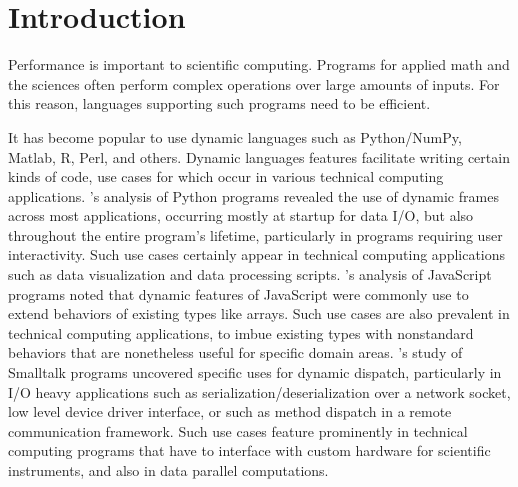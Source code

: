 \section{Introduction}
Performance is important to scientific computing. Programs for applied math and the sciences often perform complex operations over large amounts of inputs. For this reason, languages supporting such programs need to be efficient.

It has become popular to use dynamic languages such as Python/NumPy, Matlab, R, Perl, and others.
Dynamic languages features facilitate writing certain kinds of code, use cases
for which occur in various technical computing applications.
\cite{Holkner2009}'s analysis of Python programs revealed the use of dynamic
frames across most applications, occurring mostly at startup for data I/O, but
also throughout the entire program's lifetime, particularly in programs
requiring user interactivity. Such use cases certainly appear in technical
computing applications such as data visualization and data processing scripts.
\cite{Richards2010}'s analysis of JavaScript programs noted that dynamic
features of JavaScript were commonly use to extend behaviors of existing types
like arrays. Such use cases are also prevalent in technical computing
applications, to imbue existing types with nonstandard behaviors that are
nonetheless useful for specific domain areas. \cite{Callau2012}'s study of
Smalltalk programs uncovered specific uses for dynamic dispatch, particularly
in I/O heavy applications such as serialization/deserialization over a network
socket, low level device driver interface, or such as method dispatch in a
remote communication framework. Such use cases feature prominently in
technical computing programs that have to interface with custom hardware for
scientific instruments, and also in data parallel computations.

